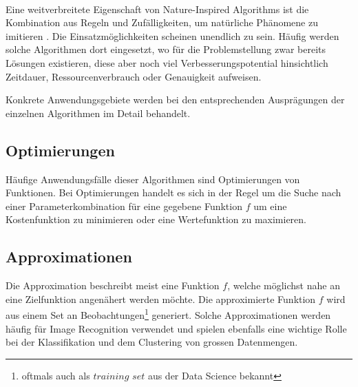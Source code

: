 \cite[Kap. 1.2]{Bro11} \\

Eine weitverbreitete Eigenschaft von Nature-Inspired Algorithms ist die Kombination aus Regeln und Zufälligkeiten, um
natürliche Phänomene zu imitieren \cite{NH15}. Die Einsatzmöglichkeiten scheinen unendlich zu sein. Häufig werden
solche Algorithmen dort eingesetzt, wo für die Problemstellung zwar bereits Lösungen existieren, diese aber noch viel
Verbesserungspotential hinsichtlich Zeitdauer, Ressourcenverbrauch oder Genauigkeit aufweisen.

Konkrete Anwendungsgebiete werden bei den entsprechenden Ausprägungen der einzelnen Algorithmen im Detail behandelt.


\subsection{Optimierungen}
Häufige Anwendungsfälle dieser Algorithmen sind Optimierungen von Funktionen. Bei Optimierungen
handelt es sich in der Regel um die Suche nach einer Parameterkombination für eine gegebene Funktion $f$ um eine
Kostenfunktion zu minimieren oder eine Wertefunktion zu maximieren.

\subsection{Approximationen}
Die Approximation beschreibt meist eine Funktion $f$, welche möglichst nahe an eine Zielfunktion angenähert werden
möchte. Die approximierte Funktion $f$ wird aus einem Set an Beobachtungen\footnote{oftmals auch als $training$ $set$ aus
der Data Science bekannt} generiert. Solche Approximationen werden häufig für Image Recognition verwendet
und spielen ebenfalls eine wichtige Rolle bei der Klassifikation und dem Clustering von grossen Datenmengen.